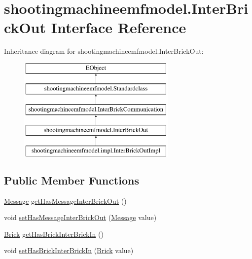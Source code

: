 \hypertarget{interfaceshootingmachineemfmodel_1_1_inter_brick_out}{\section{shootingmachineemfmodel.\-Inter\-Brick\-Out Interface Reference}
\label{interfaceshootingmachineemfmodel_1_1_inter_brick_out}
}
Inheritance diagram for shootingmachineemfmodel.\-Inter\-Brick\-Out\-:\begin{figure}[H]
\begin{center}
\leavevmode
\includegraphics[height=5.000000cm]{interfaceshootingmachineemfmodel_1_1_inter_brick_out}
\end{center}
\end{figure}
\subsection*{Public Member Functions}
\begin{DoxyCompactItemize}
\item 
\hyperlink{interfaceshootingmachineemfmodel_1_1_message}{Message} \hyperlink{interfaceshootingmachineemfmodel_1_1_inter_brick_out_a1d074e3f284a320a67d9f07758cfc7f4}{get\-Has\-Message\-Inter\-Brick\-Out} ()
\item 
void \hyperlink{interfaceshootingmachineemfmodel_1_1_inter_brick_out_a79ba223edaa3f1f6fb2e3d1ab3b901dc}{set\-Has\-Message\-Inter\-Brick\-Out} (\hyperlink{interfaceshootingmachineemfmodel_1_1_message}{Message} value)
\item 
\hyperlink{interfaceshootingmachineemfmodel_1_1_brick}{Brick} \hyperlink{interfaceshootingmachineemfmodel_1_1_inter_brick_out_ac001b4f98beeb5b922f57992b77dd0ad}{get\-Has\-Brick\-Inter\-Brick\-In} ()
\item 
void \hyperlink{interfaceshootingmachineemfmodel_1_1_inter_brick_out_a69b2182949e727f5a0841abc7199e2c5}{set\-Has\-Brick\-Inter\-Brick\-In} (\hyperlink{interfaceshootingmachineemfmodel_1_1_brick}{Brick} value)
\end{DoxyCompactItemize}


